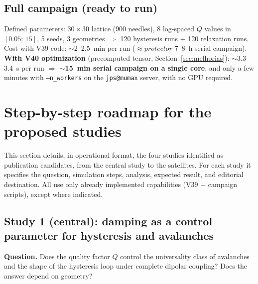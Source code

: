 \documentclass[11pt,a4paper]{article}
\newcommand{\code}[1]{\texttt{#1}}
\begin{document}
\subsection{Full campaign (ready to run)}

Defined parameters: $30\times30$ lattice (900 needles), 8 log-spaced $Q$ values in $[0.05;\,15]$, 5 seeds, 3 geometries $\Rightarrow$ 120 hysteresis runs + 120 relaxation runs. Cost with V39 code: $\sim$2--2.5~min per run ($\approx protector$ 7--8~h serial campaign). \textbf{With V40 optimization} (precomputed tensor, Section~\ref{sec:melhorias}): $\sim$3.3--3.4~s per run $\Rightarrow$ \textbf{$\sim$15~min serial campaign on a single core}, and only a few minutes with \code{--n\_workers} on the \code{jps@mumax} server, with no GPU required.

\section{Step-by-step roadmap for the proposed studies}
\label{sec:roteiro}

This section details, in operational format, the four studies identified as publication candidates, from the central study to the satellites. For each study it specifies the question, simulation steps, analysis, expected result, and editorial destination. All use only already implemented capabilities (V39 + campaign scripts), except where indicated.

\subsection{Study 1 (central): damping as a control parameter for hysteresis and avalanches}

\textbf{Question.} Does the quality factor $Q$ control the universality class of avalanches and the shape of the hysteresis loop under complete dipolar coupling? Does the answer depend on geometry?
\end{document}
